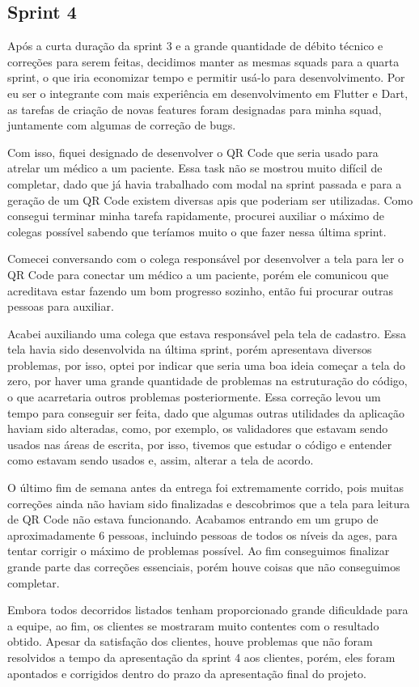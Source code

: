 \subsection{Sprint 4}

Após a curta duração da sprint 3 e a grande quantidade de débito técnico e correções para serem feitas, decidimos manter as mesmas squads para a quarta sprint, o que iria economizar tempo e permitir usá-lo para desenvolvimento. Por eu ser o integrante com mais experiência em desenvolvimento em Flutter\cite{flutter} e Dart\cite{dart}, as tarefas de criação de novas features foram designadas para minha squad, juntamente com algumas de correção de bugs.

Com isso, fiquei designado de desenvolver o QR Code que seria usado para atrelar um médico a um paciente. Essa task não se mostrou muito difícil de completar, dado que já havia trabalhado com modal na sprint passada e para a geração de um QR Code existem diversas \ac{api}s que poderiam ser utilizadas. Como consegui terminar minha tarefa rapidamente, procurei auxiliar o máximo de colegas possível sabendo que teríamos muito o que fazer nessa última sprint.

Comecei conversando com o colega responsável por desenvolver a tela para ler o QR Code para conectar um médico a um paciente, porém ele comunicou que acreditava estar fazendo um bom progresso sozinho, então fui procurar outras pessoas para auxiliar. 

Acabei auxiliando uma colega que estava responsável pela tela de cadastro. Essa tela havia sido desenvolvida na última sprint, porém apresentava diversos problemas, por isso, optei por indicar que seria uma boa ideia começar a tela do zero, por haver uma grande quantidade de problemas na estruturação do código, o que acarretaria outros problemas posteriormente. Essa correção levou um tempo para conseguir ser feita, dado que algumas outras utilidades da aplicação haviam sido alteradas, como, por exemplo, os validadores que estavam sendo usados nas áreas de escrita, por isso, tivemos que estudar o código e entender como estavam sendo usados e, assim, alterar a tela de acordo.

O último fim de semana antes da entrega foi extremamente corrido, pois muitas correções ainda não haviam sido finalizadas e descobrimos que a tela para leitura de QR Code não estava funcionando. Acabamos entrando em um grupo de aproximadamente 6 pessoas, incluindo pessoas de todos os níveis da \ac{ages}, para tentar corrigir o máximo de problemas possível. Ao fim conseguimos finalizar grande parte das correções essenciais, porém houve coisas que não conseguimos completar.

Embora todos decorridos listados tenham proporcionado grande dificuldade para a equipe, ao fim, os clientes se mostraram muito contentes com o resultado obtido. Apesar da satisfação dos clientes, houve problemas que não foram resolvidos a tempo da apresentação da sprint 4 aos clientes, porém, eles foram apontados e corrigidos dentro do prazo da apresentação final do projeto.